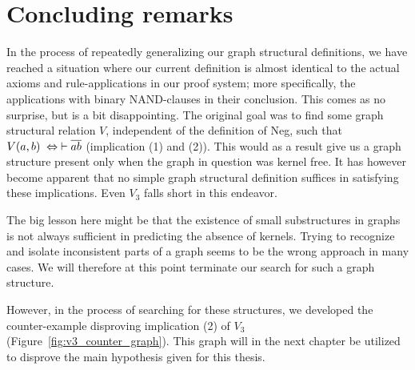 \section{Concluding remarks}
\label{sec:Concluding remarks}
In the process of repeatedly generalizing our graph structural definitions, we have reached a situation where our current definition is almost identical to the actual axioms and rule-applications in our proof system; more specifically, the applications with binary NAND-clauses in their conclusion.
This comes as no surprise, but is a bit disappointing.
The original goal was to find some graph structural relation $V$, independent of the definition of Neg, such that $V(a,b) \; \Leftrightarrow \; \vdash \ol{ab}$ (implication (1) and (2)).
This would as a result give us a graph structure present only when the graph in question was kernel free.
It has however become apparent that no simple graph structural definition suffices in satisfying these implications.
Even $V_3$ falls short in this endeavor.

The big lesson here might be that the existence of small substructures in graphs is not always sufficient in predicting the absence of kernels.
Trying to recognize and isolate inconsistent parts of a graph seems to be the wrong approach in many cases.
We will therefore at this point terminate our search for such a graph structure.

However, in the process of searching for these structures, we developed the counter-example disproving implication (2) of $V_3$ (Figure~\ref{fig:v3_counter_graph}).
This graph will in the next chapter be utilized to disprove the main hypothesis given for this thesis.
